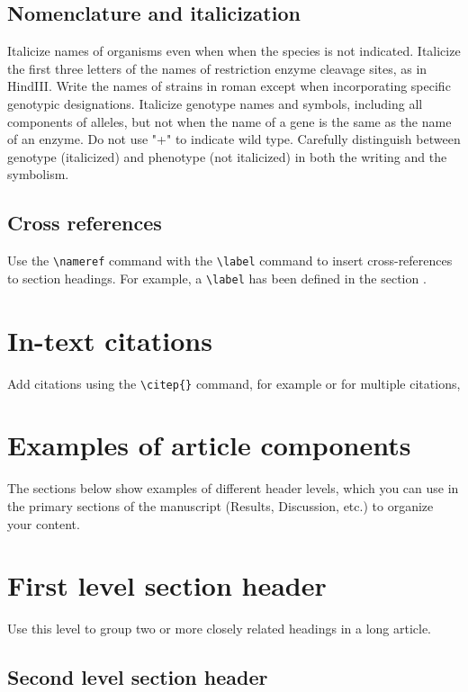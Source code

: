 \documentclass[9pt,twocolumn,twoside,lineno]{gsajnl}
\begin{document}
\subsection{Nomenclature and italicization} Italicize names of organisms even when  when the species is not indicated.  Italicize the first three letters of the names of restriction enzyme cleavage sites, as in HindIII. Write the names of strains in roman except when incorporating specific genotypic designations. Italicize genotype names and symbols, including all components of alleles, but not when the name of a gene is the same as the name of an enzyme. Do not use "+" to indicate wild type. Carefully distinguish between genotype (italicized) and phenotype (not italicized) in both the writing and the symbolism.

\subsection{Cross references}
Use the \verb|\nameref| command with the \verb|\label| command to insert cross-references to section headings. For example, a \verb|\label| has been defined in the section .

\section{In-text citations}

Add citations using the \verb|\citep{}| command, for example \citep{neher2013genealogies} or for multiple citations, \citep{neher2013genealogies, rodelsperger2014characterization,Falush16}

\section{Examples of article components}
\label{sec:examples}

The sections below show examples of different header levels, which you can use in the primary sections of the manuscript (Results, Discussion, etc.) to organize your content.

\section{First level section header}

Use this level to group two or more closely related headings in a long article.

\subsection{Second level section header}
\end{document}

